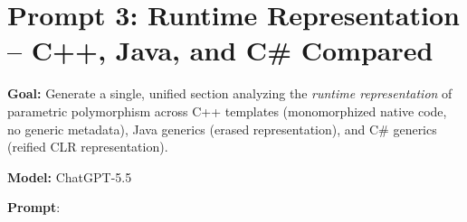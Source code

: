 \documentclass[11pt]{report}
\begin{document}
\section{Prompt 3: Runtime Representation -- C++, Java, and C\# Compared}
\label{Prompt 3 Runtime}

\noindent\textbf{Goal:} Generate a single, unified section analyzing the \emph{runtime representation} of parametric polymorphism across C++ templates (monomorphized native code, no generic metadata), Java generics (erased representation), and C\# generics (reified CLR representation).

\noindent\textbf{Model:} ChatGPT-5.5

\vspace{0.5em}
\noindent\textbf{Prompt}:
\end{document}
